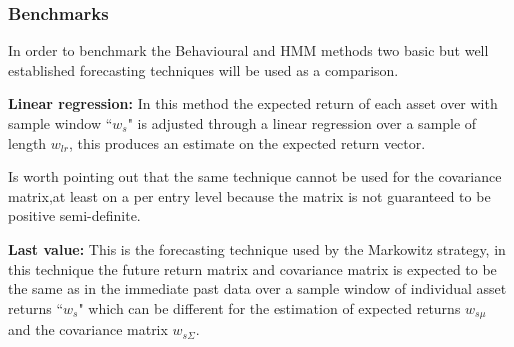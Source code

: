 \subsubsection{Benchmarks}
In order to benchmark the Behavioural and \ac{HMM} methods two basic but well established forecasting techniques will be used as a comparison.

\textbf{Linear regression:} In this method the expected return of each asset over with sample window ``$w_s$" is adjusted through a linear regression over a sample of length $w_{lr}$, this produces an estimate on the expected return vector. 

Is worth pointing out that the same technique cannot be used for the covariance matrix,at least on a per entry level because the matrix is not guaranteed to be positive semi-definite.

\textbf{Last value:} This is the forecasting technique used by the Markowitz strategy, in this technique the future return matrix and covariance matrix is expected to be the same as in the immediate past data over a sample window of individual asset returns ``$w_s$" which can be different for the estimation of expected returns $w_{s\mu}$ and the covariance matrix $w_{s\Sigma}$. 
